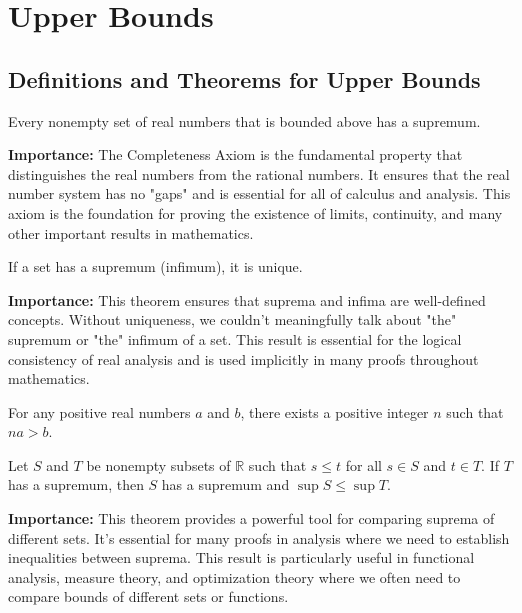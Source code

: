 \section{Upper Bounds}

\subsection*{Definitions and Theorems for Upper Bounds}


\begin{theorem}
Every nonempty set of real numbers that is bounded above has a supremum.
\end{theorem}

\noindent\textbf{Importance:} The Completeness Axiom is the fundamental property that distinguishes the real numbers from the rational numbers. It ensures that the real number system has no "gaps" and is essential for all of calculus and analysis. This axiom is the foundation for proving the existence of limits, continuity, and many other important results in mathematics.



\begin{theorem}
If a set has a supremum (infimum), it is unique.
\end{theorem}

\noindent\textbf{Importance:} This theorem ensures that suprema and infima are well-defined concepts. Without uniqueness, we couldn't meaningfully talk about "the" supremum or "the" infimum of a set. This result is essential for the logical consistency of real analysis and is used implicitly in many proofs throughout mathematics.

\begin{theorem}
For any positive real numbers $a$ and $b$, there exists a positive integer $n$ such that $na > b$.
\end{theorem}


\begin{theorem}
Let $S$ and $T$ be nonempty subsets of $\mathbb{R}$ such that $s \leq t$ for all $s \in S$ and $t \in T$. If $T$ has a supremum, then $S$ has a supremum and $\sup S \leq \sup T$.
\end{theorem}

\noindent\textbf{Importance:} This theorem provides a powerful tool for comparing suprema of different sets. It's essential for many proofs in analysis where we need to establish inequalities between suprema. This result is particularly useful in functional analysis, measure theory, and optimization theory where we often need to compare bounds of different sets or functions.


